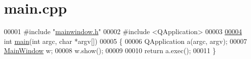 \hypertarget{a00037_source}{\section{main.\+cpp}
\label{a00037_source}
}

\begin{DoxyCode}
00001 \textcolor{preprocessor}{#include "\hyperlink{a00039}{mainwindow.h}"}
00002 \textcolor{preprocessor}{#include <QApplication>}
00003 
\hypertarget{a00037_source_l00004}{}\hyperlink{a00037_a0ddf1224851353fc92bfbff6f499fa97}{00004} \textcolor{keywordtype}{int} \hyperlink{a00037_a0ddf1224851353fc92bfbff6f499fa97}{main}(\textcolor{keywordtype}{int} argc, \textcolor{keywordtype}{char} *argv[])
00005 \{
00006     QApplication a(argc, argv);
00007      \hyperlink{a00006}{MainWindow} w;
00008     w.show();
00009 
00010     \textcolor{keywordflow}{return} a.exec();
00011 \}
\end{DoxyCode}
